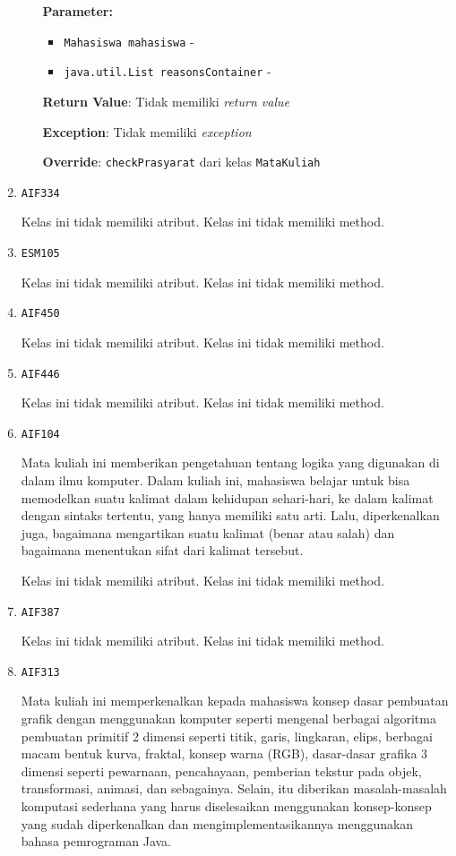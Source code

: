 \documentclass{article}
\begin{document}
\begin{enumerate}
\begin{itemize}
\textbf{Parameter:}
\begin{itemize}
\item \texttt{Mahasiswa mahasiswa} - 
\item \texttt{java.util.List reasonsContainer} - 
\end{itemize}
\textbf{Return Value}: Tidak memiliki \textit{return value}

\textbf{Exception}: Tidak memiliki \textit{exception}

\textbf{Override}: \texttt{checkPrasyarat} dari kelas \texttt{MataKuliah}

\end{itemize}
\item \texttt{AIF334}



Kelas ini tidak memiliki atribut. Kelas ini tidak memiliki method. \item \texttt{ESM105}



Kelas ini tidak memiliki atribut. Kelas ini tidak memiliki method. \item \texttt{AIF450}



Kelas ini tidak memiliki atribut. Kelas ini tidak memiliki method. \item \texttt{AIF446}



Kelas ini tidak memiliki atribut. Kelas ini tidak memiliki method. \item \texttt{AIF104}

Mata kuliah ini memberikan pengetahuan tentang logika yang digunakan di 
 dalam ilmu komputer. Dalam kuliah ini, mahasiswa belajar untuk bisa 
 memodelkan suatu kalimat dalam kehidupan sehari-hari, ke dalam kalimat 
 dengan sintaks tertentu, yang hanya memiliki satu arti. Lalu, diperkenalkan 
 juga, bagaimana mengartikan suatu kalimat (benar atau salah) dan bagaimana 
 menentukan sifat dari kalimat tersebut.

Kelas ini tidak memiliki atribut. Kelas ini tidak memiliki method. \item \texttt{AIF387}



Kelas ini tidak memiliki atribut. Kelas ini tidak memiliki method. \item \texttt{AIF313}

Mata kuliah ini memperkenalkan kepada mahasiswa konsep dasar pembuatan grafik
 dengan menggunakan komputer seperti mengenal berbagai algoritma pembuatan
 primitif 2 dimensi seperti titik, garis, lingkaran, elips, berbagai macam
 bentuk kurva, fraktal, konsep warna (RGB), dasar-dasar grafika 3 dimensi
 seperti pewarnaan, pencahayaan, pemberian tekstur pada objek, transformasi,
 animasi, dan sebagainya. Selain, itu diberikan masalah-masalah komputasi
 sederhana yang harus diselesaikan menggunakan konsep-konsep yang sudah
 diperkenalkan dan mengimplementasikannya menggunakan bahasa pemrograman Java.


\end{enumerate}
\end{document}
